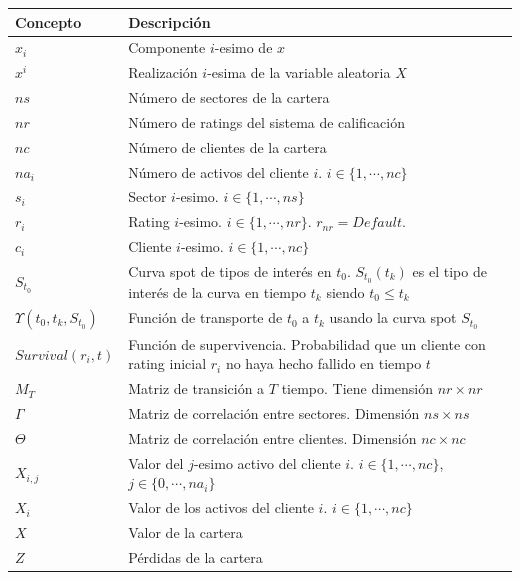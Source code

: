 \begin{tabular}{|p{2.5cm}|p{9cm}|}
\hline
\textbf{Concepto} & \textbf{Descripci\'on} \\
\hline
\hline
$x_i$ & Componente $i$-esimo de $x$ \\
\hline
$x^i$ & Realizaci\'on $i$-esima de la variable aleatoria $X$ \\
\hline
\hline
$ns$ & N\'umero de sectores de la cartera \\
\hline
$nr$ & N\'umero de ratings del sistema de calificaci\'on \\
\hline
$nc$ & N\'umero de clientes de la cartera \\
\hline
$na_i$ &  N\'umero de activos del cliente $i$. $i \in \{1,\cdots,nc\}$\\
\hline
\hline
$s_i$ & Sector $i$-esimo. $i \in \{1,\cdots,ns\}$ \\
\hline
$r_i$ & Rating $i$-esimo. $i \in \{1,\cdots,nr\}$. $r_{nr}=Default$. \\
\hline
$c_i$ & Cliente $i$-esimo. $i \in \{1,\cdots,nc\}$ \\
\hline
\hline
$S_{t_0}$ & Curva spot de tipos de inter\'es en $t_0$. $S_{t_0}(t_k)$ es el
tipo de inter\'es de la curva en tiempo $t_k$ siendo $t_0 \leq t_k$\\
\hline
$\Upsilon(t_0,t_k, S_{t_0})$ & Funci\'on de transporte de $t_0$ a $t_k$ usando 
la curva spot $S_{t_0}$ \\
\hline
\hline
$Survival(r_i,t)$ & Funci\'on de supervivencia. Probabilidad que un cliente con 
rating inicial $r_i$ no haya hecho fallido en tiempo $t$\\
\hline
$M_T$ & Matriz de transici\'on a $T$ tiempo. Tiene dimensi\'on $nr \times nr$\\
\hline
$\Gamma$ & Matriz de correlaci\'on entre sectores. Dimensi\'on $ns \times ns$\\
\hline
$\Theta$ & Matriz de correlaci\'on entre clientes. Dimensi\'on $nc \times nc$\\
\hline
\hline
$X_{i,j}$ & Valor del $j$-esimo activo del cliente $i$.
$i \in \{1,\cdots,nc\}$, $j \in \{0,\cdots,na_i\}$ \\
\hline
$X_i$ & Valor de los activos del cliente $i$. $i \in \{1,\cdots,nc\}$ \\
\hline
$X$ & Valor de la cartera\\
\hline
$Z$ & P\'erdidas de la cartera\\
\hline
\end{tabular}


